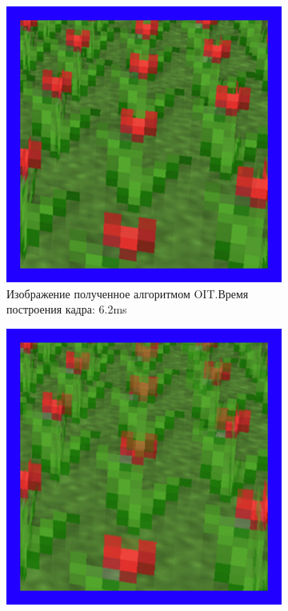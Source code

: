 			\begin{figure}[!htbp]
				\centering
				\begin{subfigure}[b]{0.3\textwidth}
					\centering
					\includegraphics[width=\textwidth]{my_folder/images//oit_flower}
					\caption{Изображение полученное алгоритмом OIT.\linebreak Время построения кадра: 6.2ms}
					\label{fig:oit_flower}
				\end{subfigure}
				\begin{subfigure}[b]{0.3\textwidth}
					\centering
					\includegraphics[width=\textwidth]{my_folder/images//wboit_flower}

\end{subfigure}
\end{figure}
